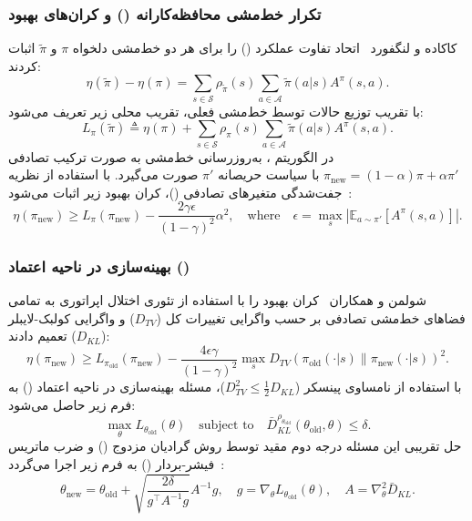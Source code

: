 \subsubsection*{تکرار خط‌مشی محافظه‌کارانه () و کران‌های بهبود}
کاکاده و لنگفورد~\cite{kakade2002approximately} اتحاد تفاوت عملکرد () را برای هر دو خط‌مشی دلخواه $\pi$ و $\tilde{\pi}$ اثبات کردند:
\begin{equation}
\eta(\tilde{\pi}) - \eta(\pi) = \sum_{s \in \mathcal{S}} \rho_{\tilde{\pi}}(s) \sum_{a \in \mathcal{A}} \tilde{\pi}(a|s) A^\pi(s, a).
\end{equation}
با تقریب توزیع حالات توسط خط‌مشی فعلی، تقریب محلی زیر تعریف می‌شود:
\begin{equation}
L_\pi(\tilde{\pi}) \triangleq \eta(\pi) + \sum_{s \in \mathcal{S}} \rho_\pi(s) \sum_{a \in \mathcal{A}} \tilde{\pi}(a|s) A^\pi(s, a).
\end{equation}
در الگوریتم ، به‌روزرسانی خط‌مشی به صورت ترکیب تصادفی $\pi_{\text{new}} = (1 - \alpha)\pi + \alpha \pi'$ با سیاست حریصانه $\pi'$ صورت می‌گیرد. با استفاده از نظریه جفت‌شدگی متغیرهای تصادفی ()، کران بهبود زیر اثبات می‌شود~\cite{kakade2002approximately}:
\begin{equation}
\eta(\pi_{\text{new}}) \ge L_\pi(\pi_{\text{new}}) - \frac{2\gamma\epsilon}{(1 - \gamma)^2} \alpha^2, \quad \text{where} \quad \epsilon = \max_s |\mathbb{E}_{a \sim \pi'} [A^\pi(s, a)]|.
\end{equation}

\subsubsection*{بهینه‌سازی در ناحیه اعتماد ()}
شولمن و همکاران~\cite{schulman2015trust} کران بهبود  را با استفاده از تئوری اختلال اپراتوری به تمامی فضاهای خط‌مشی تصادفی بر حسب واگرایی تغییرات کل ($D_{TV}$) و واگرایی کولبک-لایبلر ($D_{KL}$) تعمیم دادند:
\begin{equation}
\eta(\pi_{\text{new}}) \ge L_{\pi_{\text{old}}}(\pi_{\text{new}}) - \frac{4\epsilon\gamma}{(1 - \gamma)^2} \max_{s} D_{TV}(\pi_{\text{old}}(\cdot|s) \parallel \pi_{\text{new}}(\cdot|s))^2.
\end{equation}
با استفاده از نامساوی پینسکر ($D_{TV}^2 \le \frac{1}{2} D_{KL}$)، مسئله بهینه‌سازی در ناحیه اعتماد () به فرم زیر حاصل می‌شود:
\begin{equation}
\max_{\theta} L_{\theta_{\text{old}}}(\theta) \quad \text{subject to} \quad \bar{D}_{KL}^{\rho_{\theta_{\text{old}}}}(\theta_{\text{old}}, \theta) \le \delta.
\end{equation}
حل تقریبی این مسئله درجه دوم مقید توسط روش گرادیان مزدوج () و ضرب ماتریس فیشر-بردار () به فرم زیر اجرا می‌گردد~\cite{schulman2015trust}:
\begin{equation}
\theta_{\text{new}} = \theta_{\text{old}} + \sqrt{\frac{2\delta}{g^\top A^{-1} g}} A^{-1} g, \quad g = \nabla_\theta L_{\theta_{\text{old}}}(\theta), \quad A = \nabla_\theta^2 \bar{D}_{KL}.
\end{equation}

